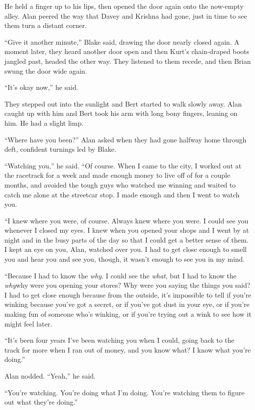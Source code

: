 He held a finger up to his lips, then opened the door again onto the
now-empty alley.  Alan peered the way that Davey and Krishna had gone,
just in time to see them turn a distant corner.

``Give it another minute,'' Blake said, drawing the door nearly closed
again.  A moment later, they heard another door open and then Kurt's
chain-draped boots jangled past, headed the other way.  They listened
to them recede, and then Brian swung the door wide again.

``It's okay now,'' he said.

They stepped out into the sunlight and Bert started to walk slowly
away.  Alan caught up with him and Bert took his arm with long bony
fingers, leaning on him.  He had a slight limp.

``Where have you been?'' Alan asked when they had gone halfway home
through deft, confident turnings led by Blake.

``Watching you,'' he said.  ``Of course.  When I came to the city, I
worked out at the racetrack for a week and made enough money to live
off of for a couple months, and avoided the tough guys who watched me
winning and waited to catch me alone at the streetcar stop.  I made
enough and then I went to watch you.

``I knew where you were, of course.  Always knew where you were.  I
could see you whenever I closed my eyes.  I knew when you opened your
shops and I went by at night and in the busy parts of the day so that
I could get a better sense of them.  I kept an eye on you, Alan,
watched over you.  I had to get close enough to smell you and hear you
and see you, though, it wasn't enough to see you in my mind.

``Because I had to know the \textit{why}.  I could see the
\textit{what}, but I had to know the \textit{why}\dash{}why were you
opening your stores?  Why were you saying the things you said?  I had
to get close enough because from the outside, it's impossible to tell
if you're winking because you've got a secret, or if you've got dust
in your eye, or if you're making fun of someone who's winking, or if
you're trying out a wink to see how it might feel later.

``It's been four years I've been watching you when I could, going back
to the track for more when I ran out of money, and you know what?  I
know what you're doing.''

Alan nodded.  ``Yeah,'' he said.

``You're watching.  You're doing what I'm doing.  You're watching them
to figure out what they're doing.''

